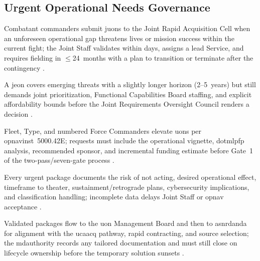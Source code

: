 \documentclass[../main.tex]{subfiles}
\begin{document}
\subsection{Urgent Operational Needs Governance}
\begin{description}[style=nextline,labelsep=0.5em,font=\bfseries]
  \item[\ac{juon}.] Combatant commanders submit \acp{juon} to the Joint Rapid Acquisition Cell when an unforeseen operational gap threatens lives or mission success within the current fight; the Joint Staff validates within days, assigns a lead Service, and requires fielding in $\leq$24~months with a plan to transition or terminate after the contingency \autocite{CJCSI3470-01H}.
  \item[\ac{jeon}.] A \ac{jeon} covers emerging threats with a slightly longer horizon (2--5~years) but still demands joint prioritization, Functional Capabilities Board staffing, and explicit affordability bounds before the Joint Requirements Oversight Council renders a decision \autocite{CJCSI5123-01H}.
\item[\ac{uon}.] Fleet, Type, and numbered Force Commanders elevate \acp{uon} per \ac{opnavinst}~5000.42E; requests must include the operational vignette, \ac{dotmlpfp} analysis, recommended sponsor, and incremental funding estimate before Gate~1 of the two-pass/seven-gate process \autocite{OPNAVINST5000-42E}.
\end{description}
\begin{description}[style=nextline,labelsep=0.5em,font=\bfseries]
\item[\textbf{Request content.}] Every urgent package documents the risk of not acting, desired operational effect, timeframe to theater, sustainment/retrograde plans, cybersecurity implications, and classification handling; incomplete data delays Joint Staff or \ac{opnav} acceptance \autocite{CJCSI3470-01H,OPNAVINST5000-42E}.
  \item[\textbf{Acquisition handoff.}] Validated packages flow to the \ac{uon} Management Board and then to \ac{asnrdanda} for alignment with the \ac{ucaacq} pathway, rapid contracting, and source selection; the \ac{mdauthority} records any tailored documentation and must still close on lifecycle ownership before the temporary solution sunsets \autocite{DoDI5000-81}.
\end{description}
\end{document}
